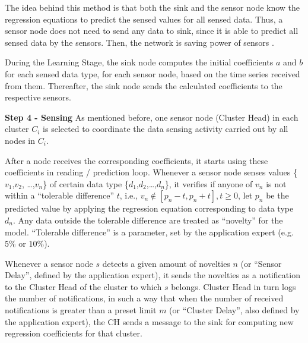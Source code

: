 \documentclass{acm_proc_article-sp}
\begin{document}
The idea behind this method is that both the sink and the sensor node know the
regression equations to predict the sensed values for all sensed data. Thus, a
sensor node does not need to send any data to sink, since it is able to predict
all sensed data by the sensors. Then, the network is saving power of sensors
\cite{MaiaACR2013}.
\vspace*{-.3cm}

During the Learning Stage, the sink node computes the initial coefficients $a$
and $b$ for each sensed data type, for each sensor node, based on the time
series received from them. Thereafter, the sink node sends the calculated
coefficients to the respective sensors.
\vspace*{-.3cm}

{\bf Step 4 - Sensing}
As mentioned before, one sensor node (Cluster Head) in each cluster $C_{i}$ is
selected to coordinate the data sensing activity carried out by all nodes in
$C_{i}$.
\vspace*{-.3cm}

After a node receives the corresponding coefficients, it starts using these
coefficients in reading / prediction loop.
Whenever a sensor node senses values \{$v_{1}$,$v_{2}$, \ldots,$v_{n}$\} of
certain data type \{$d_{1}$,$d_{2}$,\ldots,$d_{n}$\}, it verifies if anyone of
$v_{n}$ is not within a ``tolerable difference'' $t$, i.e., $v_{n} \not \in
[p_{n}-t,p_{n}+t], t \geq 0$, let $p_{n}$ be the predicted value by applying
the regression equation corresponding to data type $d_{n}$. Any data outside the
tolerable difference are treated as ``novelty'' for the model.
``Tolerable difference'' is a parameter, set by the application expert (e.g.
$5\%$ or $10\%$).
\vspace*{-.3cm}

Whenever a sensor node $s$ detects a given amount of novelties $n$ (or ``Sensor
Delay'', defined by the application expert), it sends the novelties as a
notification to the Cluster Head of the cluster to which $s$ belongs. 
Cluster Head in turn logs the number of notifications, in such a way that when
the number of received notifications is greater than a preset limit $m$ (or
``Cluster Delay'', also defined by the application expert), the CH sends a
message to the sink for computing new regression coefficients for that cluster.
\vspace*{-.3cm}
\end{document}
